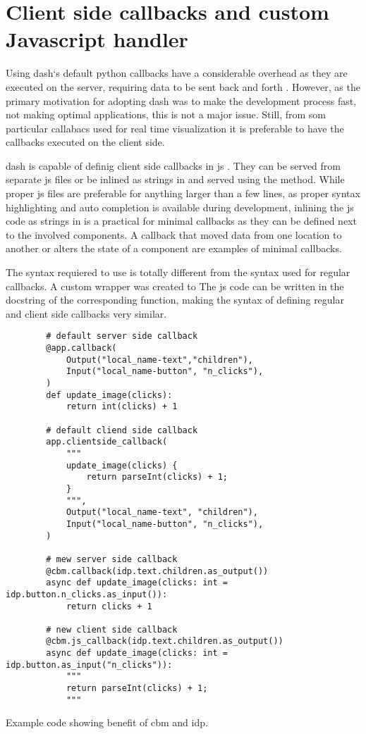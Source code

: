 \section{Client side callbacks and custom Javascript handler}
Using \gls{dash}`s default python callbacks have a considerable overhead as they are executed on the server, requiring data to be sent back and forth \cite{plotlyPartBasicCallbacks}.
However, as the primary motivation for adopting \gls{dash} was to make the development process fast, not making optimal applications, this is not a major issue.
Still, from som particular callabacs used for real time visualization it is preferable to have the callbacks executed on the client side.

\gls{dash} is capable of definig client side callbacks in \gls{js} \cite{plotlyClientsideCallbacksDash}.
They can be served from separate \gls{js} files or be inlined as strings in \py and served using the  method.
While proper \gls{js} files are preferable for anything larger than a few lines, as proper syntax highlighting and auto completion is available during development, inlining the \gls{js} code as strings in \py is a practical for minimal callbacks as they can be defined next to the involved components.
A callback that moved data from one location to another or alters the state of a component are examples of minimal callbacks.

The syntax requiered to use  is totally different from the syntax used for regular callbacks.
A custom wrapper was created to
The \gls{js} code can be written in the docstring of the corresponding \py function, making the syntax of defining regular and client side callbacks very similar.

\begin{listing}[H]
    \begin{verbatim}
        # default server side callback
        @app.callback(
            Output("local_name-text","children"),
            Input("local_name-button", "n_clicks"),
        )
        def update_image(clicks):
            return int(clicks) + 1

        # default cliend side callback
        app.clientside_callback(
            """
            update_image(clicks) {
                return parseInt(clicks) + 1;
            }
            """,
            Output("local_name-text", "children"),
            Input("local_name-button", "n_clicks"),
        )

        # mew server side callback
        @cbm.callback(idp.text.children.as_output())
        async def update_image(clicks: int = idp.button.n_clicks.as_input()):
            return clicks + 1

        # new client side callback
        @cbm.js_callback(idp.text.children.as_output())
        async def update_image(clicks: int = idp.button.as_input("n_clicks")):
            """
            return parseInt(clicks) + 1;
            """
    \end{verbatim}
    \caption{Example code showing benefit of \gls{cbm} and \gls{idp}.}
    \label{lst:cbm_idp_example}
\end{listing}